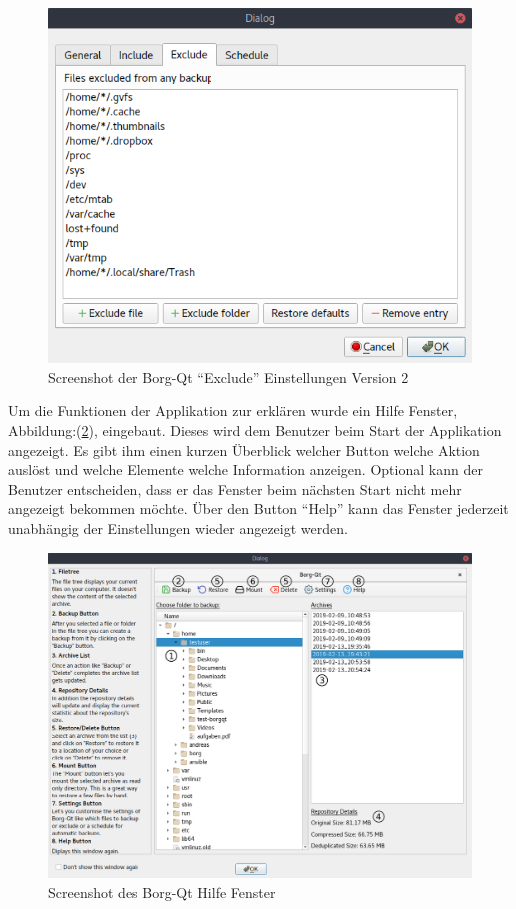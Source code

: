 \begin{figure}[H]
\centering
\includegraphics[width=.9\linewidth]{pictures/borgqt_settings_exclude_v2.png}
\caption{\label{fig:org562e65a}
Screenshot der Borg-Qt "`Exclude"' Einstellungen Version 2}
\end{figure}

Um die Funktionen der Applikation zur erklären wurde ein Hilfe Fenster,
Abbildung:(\ref{fig:orgf44d24c}), eingebaut. Dieses wird dem Benutzer beim Start der
Applikation angezeigt. Es gibt ihm einen kurzen Überblick welcher Button welche
Aktion auslöst und welche Elemente welche Information anzeigen. Optional kann
der Benutzer entscheiden, dass er das Fenster beim nächsten Start nicht mehr
angezeigt bekommen möchte. Über den Button "`Help"' kann das Fenster jederzeit
unabhängig der Einstellungen wieder angezeigt werden.

\begin{figure}[H]
\centering
\includegraphics[width=.9\linewidth]{pictures/borgqt_help.png}
\caption{\label{fig:orgf44d24c}
Screenshot des Borg-Qt Hilfe Fenster}
\end{figure}

